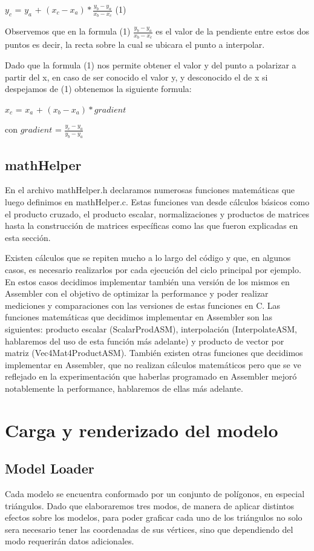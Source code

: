 \documentclass[a4paper]{article}
\begin{document}
$y_c$ = $y_a$ + $(x_c - x_a)*\frac{y_b - y_a}{x_b - x_c}$  (1)

Observemos que en la formula (1) $\frac{y_b - y_a}{x_b - x_c}$ es el valor de la  pendiente entre estos dos puntos es decir, la recta sobre la cual se ubicara el punto a interpolar. 
\par Dado que la formula (1) nos permite obtener el valor y del punto a polarizar a partir del x, en caso de ser conocido el valor y, y desconocido el de x si despejamos de (1) obtenemos la siguiente formula:

$x_c$ = $x_a$ + $(x_b - x_a)*gradient$ 

con $gradient$  = $\frac{y_c - y_a}{y_b - y_a}$

\subsection{mathHelper}
En el archivo mathHelper.h declaramos numerosas funciones matemáticas que luego definimos en mathHelper.c. Estas funciones van desde cálculos básicos como el producto cruzado, el producto escalar, normalizaciones y productos de matrices hasta la construcción de matrices específicas como las que fueron explicadas en esta sección.
\par Existen cálculos que se repiten mucho a lo largo del código y que, en algunos casos, es necesario realizarlos por cada ejecución del ciclo principal por ejemplo. En estos casos decidimos implementar también una versión de los mismos en Assembler con el objetivo de optimizar la performance y poder realizar mediciones y comparaciones con las versiones de estas funciones en C. Las funciones matemáticas que decidimos implementar en Assembler son las siguientes: producto escalar (ScalarProdASM), interpolación (InterpolateASM, hablaremos del uso de esta función más adelante) y producto de vector por matriz (Vec4Mat4ProductASM). También existen otras funciones que decidimos implementar en Assembler, que no realizan cálculos matemáticos pero que se ve reflejado en la experimentación que haberlas programado en Assembler mejoró notablemente la performance, hablaremos de ellas más adelante.

\section{Carga y renderizado del modelo}

\subsection{Model Loader}
Cada modelo se encuentra conformado por un conjunto de polígonos, en especial triángulos. Dado que elaboraremos tres modos, de manera de aplicar distintos efectos sobre los modelos, para poder graficar cada uno de los triángulos no solo sera necesario tener las coordenadas de sus vértices, sino que dependiendo del modo requerirán datos adicionales. 
\end{document}
